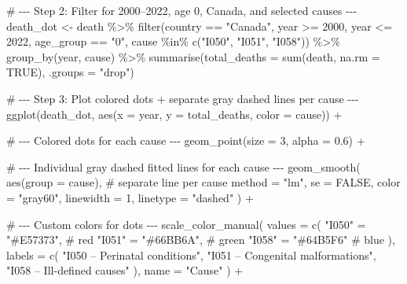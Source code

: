 \documentclass[
  letterpaper,
  DIV=11,
  numbers=noendperiod]{scrartcl}
\newenvironment{Shaded}{\begin{snugshade}}{\end{snugshade}}
\newcommand{\AttributeTok}[1]{\textcolor[rgb]{0.40,0.45,0.13}{#1}}
\newcommand{\CommentTok}[1]{\textcolor[rgb]{0.37,0.37,0.37}{#1}}
\newcommand{\ConstantTok}[1]{\textcolor[rgb]{0.56,0.35,0.01}{#1}}
\newcommand{\DecValTok}[1]{\textcolor[rgb]{0.68,0.00,0.00}{#1}}
\newcommand{\FloatTok}[1]{\textcolor[rgb]{0.68,0.00,0.00}{#1}}
\newcommand{\FunctionTok}[1]{\textcolor[rgb]{0.28,0.35,0.67}{#1}}
\newcommand{\NormalTok}[1]{\textcolor[rgb]{0.00,0.23,0.31}{#1}}
\newcommand{\OtherTok}[1]{\textcolor[rgb]{0.00,0.23,0.31}{#1}}
\newcommand{\SpecialCharTok}[1]{\textcolor[rgb]{0.37,0.37,0.37}{#1}}
\newcommand{\StringTok}[1]{\textcolor[rgb]{0.13,0.47,0.30}{#1}}
\begin{document}
\begin{Shaded}
\begin{Highlighting}[]
\CommentTok{\# {-}{-}{-} Step 2: Filter for 2000–2022, age 0, Canada, and selected causes {-}{-}{-}}
\NormalTok{death\_dot }\OtherTok{\textless{}{-}}\NormalTok{ death }\SpecialCharTok{\%\textgreater{}\%}
  \FunctionTok{filter}\NormalTok{(country }\SpecialCharTok{==} \StringTok{"Canada"}\NormalTok{,}
\NormalTok{         year }\SpecialCharTok{\textgreater{}=} \DecValTok{2000}\NormalTok{, year }\SpecialCharTok{\textless{}=} \DecValTok{2022}\NormalTok{,}
\NormalTok{         age\_group }\SpecialCharTok{==} \StringTok{"0"}\NormalTok{,}
\NormalTok{         cause }\SpecialCharTok{\%in\%} \FunctionTok{c}\NormalTok{(}\StringTok{"I050"}\NormalTok{, }\StringTok{"I051"}\NormalTok{, }\StringTok{"I058"}\NormalTok{)) }\SpecialCharTok{\%\textgreater{}\%}
  \FunctionTok{group\_by}\NormalTok{(year, cause) }\SpecialCharTok{\%\textgreater{}\%}
  \FunctionTok{summarise}\NormalTok{(}\AttributeTok{total\_deaths =} \FunctionTok{sum}\NormalTok{(death, }\AttributeTok{na.rm =} \ConstantTok{TRUE}\NormalTok{), }\AttributeTok{.groups =} \StringTok{"drop"}\NormalTok{)}

\CommentTok{\# {-}{-}{-} Step 3: Plot colored dots + separate gray dashed lines per cause {-}{-}{-}}
\FunctionTok{ggplot}\NormalTok{(death\_dot, }\FunctionTok{aes}\NormalTok{(}\AttributeTok{x =}\NormalTok{ year, }\AttributeTok{y =}\NormalTok{ total\_deaths, }\AttributeTok{color =}\NormalTok{ cause)) }\SpecialCharTok{+}
  
  \CommentTok{\# {-}{-}{-} Colored dots for each cause {-}{-}{-}}
  \FunctionTok{geom\_point}\NormalTok{(}\AttributeTok{size =} \DecValTok{3}\NormalTok{, }\AttributeTok{alpha =} \FloatTok{0.6}\NormalTok{) }\SpecialCharTok{+}
  
  \CommentTok{\# {-}{-}{-} Individual gray dashed fitted lines for each cause {-}{-}{-}}
  \FunctionTok{geom\_smooth}\NormalTok{(}
    \FunctionTok{aes}\NormalTok{(}\AttributeTok{group =}\NormalTok{ cause),   }\CommentTok{\# separate line per cause}
    \AttributeTok{method =} \StringTok{"lm"}\NormalTok{, }\AttributeTok{se =} \ConstantTok{FALSE}\NormalTok{, }\AttributeTok{color =} \StringTok{"gray60"}\NormalTok{,}
    \AttributeTok{linewidth =} \DecValTok{1}\NormalTok{, }\AttributeTok{linetype =} \StringTok{"dashed"}
\NormalTok{  ) }\SpecialCharTok{+}
  
  \CommentTok{\# {-}{-}{-} Custom colors for dots {-}{-}{-}}
  \FunctionTok{scale\_color\_manual}\NormalTok{(}
    \AttributeTok{values =} \FunctionTok{c}\NormalTok{(}
      \StringTok{"I050"} \OtherTok{=} \StringTok{"\#E57373"}\NormalTok{,   }\CommentTok{\# red}
      \StringTok{"I051"} \OtherTok{=} \StringTok{"\#66BB6A"}\NormalTok{,   }\CommentTok{\# green}
      \StringTok{"I058"} \OtherTok{=} \StringTok{"\#64B5F6"}    \CommentTok{\# blue}
\NormalTok{    ),}
    \AttributeTok{labels =} \FunctionTok{c}\NormalTok{(}
      \StringTok{"I050 – Perinatal conditions"}\NormalTok{,}
      \StringTok{"I051 – Congenital malformations"}\NormalTok{,}
      \StringTok{"I058 – Ill{-}defined causes"}
\NormalTok{    ),}
    \AttributeTok{name =} \StringTok{"Cause"}
\NormalTok{  ) }\SpecialCharTok{+}
  

\end{Highlighting}
\end{Shaded}
\end{document}
